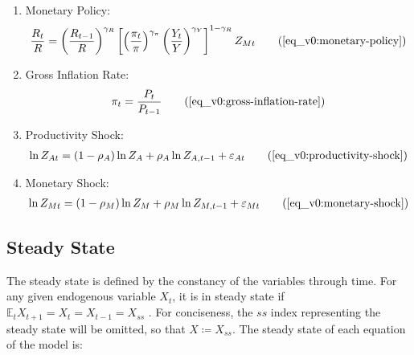 \documentclass[../thesis.tex]{subfiles}
\begin{document}
{\begin{itemize}
\begin{enumerate}
				\item Monetary Policy:
				\begin{align}
					\frac{R_t}{R} = \left( 
					\frac{R_{t-1}}{R} \right)^{\gamma_R} \left[ \left(
					\frac{\pi_t}{\pi} \right)^{\gamma_\pi} \left( 
					\frac{Y_t}{Y} \right)^{\gamma_Y} \right]^{1-\gamma_R} Z_{Mt}
					\tag{\ref{eq_v0:monetary-policy}}
				\end{align}
				
				\item Gross Inflation Rate:
				\begin{align}
					\pi_t = \frac{P_t}{P_{t-1}}
					\tag{\ref{eq_v0:gross-inflation-rate}}
				\end{align}
				
				\item Productivity Shock:
				\begin{align}
					\ln{Z_{At}} = (1-\rho_A)\ln{Z_A} + \rho_A\ln{Z_{A,t-1}} + \varepsilon_{At}
					\tag{\ref{eq_v0:productivity-shock}}
				\end{align}
				
				\item Monetary Shock:
				\begin{align}
					\ln{Z_{Mt}} = (1-\rho_M)\ln{Z_{M}} + \rho_M\ln{Z_{M,t-1}} + \varepsilon_{Mt}
					\tag{\ref{eq_v0:monetary-shock}}
				\end{align}
				
			\end{enumerate}
			
		\end{itemize}
		
	} %
	
	
	
	\subsection{Steady State}
	
	The steady state is defined by the constancy of the variables through time. For any given endogenous variable $X_t$, it is in steady state if $\mathbb{E}_t X_{t+1} = X_t = X_{t-1} = X_{ss}$ \cite[p.41]{costa_junior_understanding_2016}. For conciseness, the $ss$ index representing the steady state will be omitted, so that $X \coloneq X_{ss}$. The steady state of each equation of the model is:
	
\end{document}
